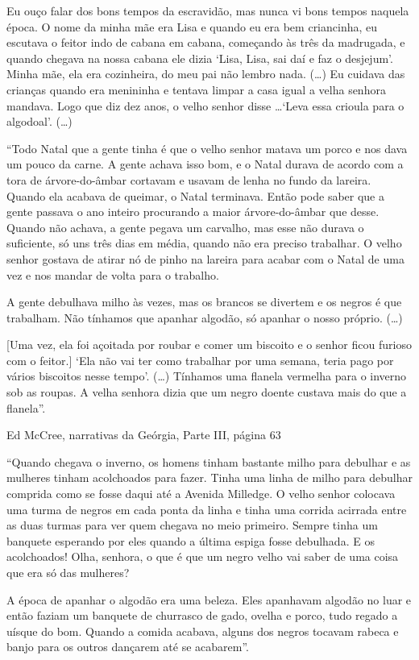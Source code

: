 Eu ouço falar dos bons tempos da escravidão, mas nunca vi bons tempos
naquela época. O nome da minha mãe era Lisa e quando eu era bem
criancinha, eu escutava o feitor indo de cabana em cabana, começando às
três da madrugada, e quando chegava na nossa cabana ele dizia `Lisa,
Lisa, sai daí e faz o desjejum'. Minha mãe, ela era cozinheira, do meu
pai não lembro nada. (\ldots{}) Eu cuidava das crianças quando era
menininha e tentava limpar a casa igual a velha senhora mandava. Logo
que diz dez anos, o velho senhor disse \ldots{}`Leva essa crioula para o
algodoal'. (\ldots{})

``Todo Natal que a gente tinha é que o velho senhor matava um porco e
nos dava um pouco da carne. A gente achava isso bom, e o Natal durava de
acordo com a tora de árvore-do-âmbar cortavam e usavam de lenha no fundo
da lareira. Quando ela acabava de queimar, o Natal terminava. Então pode
saber que a gente passava o ano inteiro procurando a maior
árvore-do-âmbar que desse. Quando não achava, a gente pegava um
carvalho, mas esse não durava o suficiente, só uns três dias em média,
quando não era preciso trabalhar. O velho senhor gostava de atirar nó de
pinho na lareira para acabar com o Natal de uma vez e nos mandar de
volta para o trabalho.

A gente debulhava milho às vezes, mas os brancos se divertem e os negros
é que trabalham. Não tínhamos que apanhar algodão, só apanhar o nosso
próprio. (\ldots{})

{[}Uma vez, ela foi açoitada por roubar e comer um biscoito e o senhor
ficou furioso com o feitor.{]} `Ela não vai ter como trabalhar por uma
semana, teria pago por vários biscoitos nesse tempo'. (\ldots{})
Tínhamos uma flanela vermelha para o inverno sob as roupas. A velha
senhora dizia que um negro doente custava mais do que a flanela''.

Ed McCree, narrativas da Geórgia, Parte III, página 63

``Quando chegava o inverno, os homens tinham bastante milho para
debulhar e as mulheres tinham acolchoados para fazer. Tinha uma linha de
milho para debulhar comprida como se fosse daqui até a Avenida Milledge.
O velho senhor colocava uma turma de negros em cada ponta da linha e
tinha uma corrida acirrada entre as duas turmas para ver quem chegava no
meio primeiro. Sempre tinha um banquete esperando por eles quando a
última espiga fosse debulhada. E os acolchoados! Olha, senhora, o que é
que um negro velho vai saber de uma coisa que era só das mulheres?

A época de apanhar o algodão era uma beleza. Eles apanhavam algodão no
luar e então faziam um banquete de churrasco de gado, ovelha e porco,
tudo regado a uísque do bom. Quando a comida acabava, alguns dos negros
tocavam rabeca e banjo para os outros dançarem até se acabarem''.

